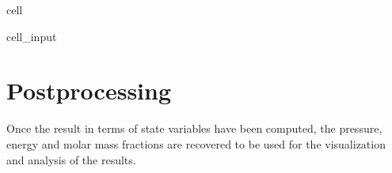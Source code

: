 \documentclass[letterpaper,10pt,english]{jupyterBook}
\begin{document}
\begin{sphinxuseclass}{cell}
\begin{sphinxVerbatimInput}
\begin{sphinxuseclass}{cell_input}
\begin{sphinxVerbatim}[commandchars=\\\{\}]
      
      
      
    
  
\end{sphinxVerbatim}

\end{sphinxuseclass}\end{sphinxVerbatimInput}

\end{sphinxuseclass}

\section{Post\sphinxhyphen{}processing}
\label{\detokenize{2_Temperature/_2T_Problem_class_definition:post-processing}}
\sphinxAtStartPar
Once the result in terms of state variables have been computed, the pressure, energy and molar mass fractions are recovered to be used for the visualization and analysis of the results.
\end{document}
